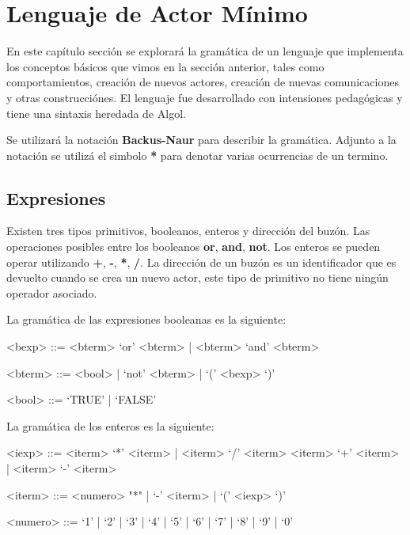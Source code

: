 \chapter{Lenguaje de Actor Mínimo}

En este capítulo sección se explorará la gramática de un lenguaje que implementa los conceptos básicos que vimos en la sección anterior, tales como comportamientos, creación de nuevos actores, creación de nuevas comunicaciones y otras construcciónes. El lenguaje \SAL fue desarrollado con intensiones pedagógicas y tiene una sintaxis heredada de Algol. 

Se utilizará la notación \textbf{Backus-Naur} para describir la gramática. Adjunto a la notación se utilizá el simbolo \textbf{*} para denotar varias ocurrencias de un termino. 

\section{Expresiones}
Existen tres tipos primitivos, booleanos, enteros y dirección del buzón. Las operaciones posibles entre los booleanos \textbf{or}, \textbf{and}, \textbf{not}. Los enteros se pueden operar utilizando \textbf{+}, \textbf{-}, \textbf{*}, \textbf{/}. La dirección de un buzón es un identificador que es devuelto cuando se crea un nuevo actor,  este tipo de primitivo no tiene ningún operador asociado.

La gramática de las expresiones booleanas es la siguiente:

\begin{grammar}

<bexp> ::= <bterm> `or' <bterm> | <bterm> `and' <bterm> 
  
<bterm> ::= <bool> | `not' <bterm> | `(' <bexp> `)' 

<bool> ::= `TRUE' | `FALSE'

\end{grammar}

La gramática de los enteros es la siguiente:

\begin{grammar}

<iexp> ::= <iterm> `*' <iterm> | <iterm> `/' <iterm>  
  \alt <iterm> `+' <iterm>  | <iterm> `-' <iterm>

<iterm> ::= <numero> "*" | `-' <iterm> | `(' <iexp> `)'

<numero> ::= `1' | `2' | `3' | `4' | `5' | `6' | `7' | `8' | `9' | `0'

\end{grammar}


